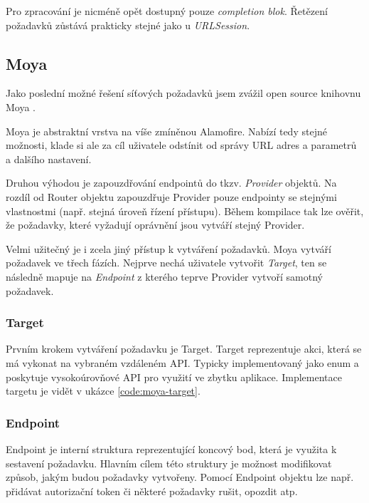 Pro zpracování je nicméně opět dostupný pouze \textit{completion blok}.
Řetězení požadavků zůstává prakticky stejné jako u \textit{URLSession}.

\subsection{Moya}

Jako poslední možné řešení síťových požadavků jsem zvážil open source knihovnu Moya \cite{github-moya}.

Moya je abstraktní vrstva na víše zmíněnou Alamofire.
Nabízí tedy stejné možnosti, klade si ale za cíl uživatele odstínit od správy URL adres a parametrů a dalšího nastavení.

Druhou výhodou je zapouzdřování endpointů do tkzv. \textit{Provider} objektů.
Na rozdíl od Router objektu zapouzdřuje Provider pouze endpointy se stejnými vlastnostmi (např. stejná úroveň řízení přístupu).
Během kompilace tak lze ověřit, že požadavky, které vyžadují oprávnění jsou vytváří stejný Provider.

\medskip

Velmi užitečný je i zcela jiný přístup k vytváření požadavků.
Moya vytváří požadavek ve třech fázích.
Nejprve nechá uživatele vytvořit \textit{Target}, ten se následně mapuje na \textit{Endpoint} z kterého teprve Provider vytvoří samotný požadavek.

\subsubsection*{Target}

Prvním krokem vytváření požadavku je Target.
Target reprezentuje akci, která se má vykonat na vybraném vzdáleném API.
Typicky implementovaný jako enum a poskytuje vysokoúrovňové API pro využití ve zbytku aplikace.
Implementace targetu je vidět v ukázce \ref{code:moya-target}.


\subsubsection*{Endpoint}

Endpoint je interní struktura reprezentující koncový bod, která je využita k sestavení požadavku.
Hlavním cílem této struktury je možnost modifikovat způsob, jakým budou požadavky vytvořeny.
Pomocí Endpoint objektu lze např. přidávat autorizační token či některé požadavky rušit, opozdit atp.

